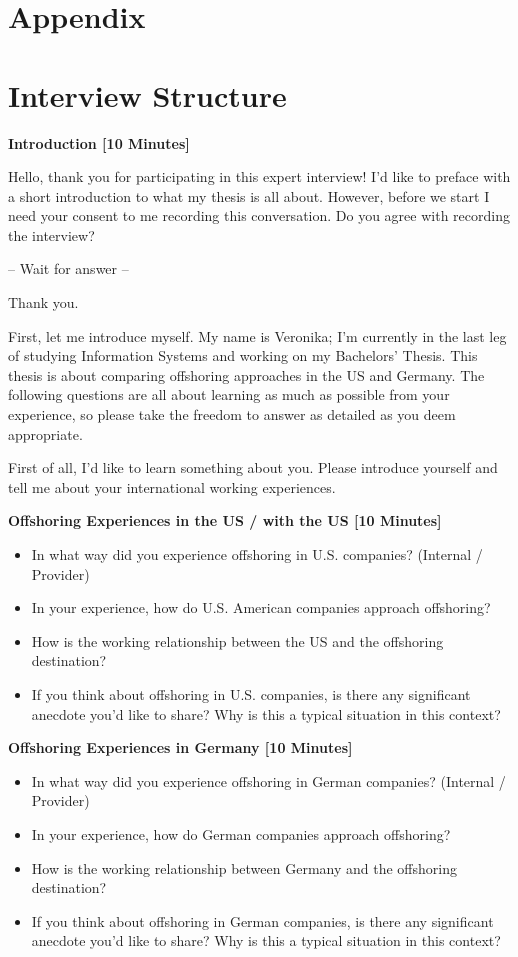 \begin{appendix}
\section*{Appendix}
\label{Appendix}

\tocless\section{Interview Structure}
\label{app:InterviewStructure}
{\bf Introduction [10 Minutes]}

Hello, thank you for participating in this expert interview! I’d like to preface with a short introduction to what my thesis is all about. However, before we start I need your consent to me recording this conversation. Do you agree with recording the interview?

 – Wait for answer –
 
Thank you.

First, let me introduce myself. My name is Veronika; I’m currently in the last leg of studying Information Systems and working on my Bachelors’ Thesis. This thesis is about comparing offshoring approaches in the US and Germany. 
The following questions are all about learning as much as possible from your experience, so please take the freedom to answer as detailed as you deem appropriate.

First of all, I’d like to learn something about you. Please introduce yourself and tell me about your international working experiences.

{\bf Offshoring   Experiences in the US / with the US [10 Minutes]}
\begin{itemize}
	\item In what way did you experience offshoring in U.S. companies? (Internal / Provider)
	\item In your experience, how do U.S. American companies approach offshoring?
	\item How is the working relationship between the US and the offshoring destination?
	\item If you think about offshoring in U.S. companies, is there any significant anecdote you’d like to share? Why is this a typical situation in this context?
\end{itemize}
	
{\bf Offshoring Experiences in Germany [10 Minutes]}

\begin{itemize}
	\item In what way did you experience offshoring in German companies? (Internal / Provider)
	\item In your experience, how do German companies approach offshoring?
	\item How is the working relationship between Germany and the offshoring destination?
	\item If you think about offshoring in German companies, is there any significant anecdote you’d like to share? Why is this a typical situation in this context?
\end{itemize}



\end{appendix}
